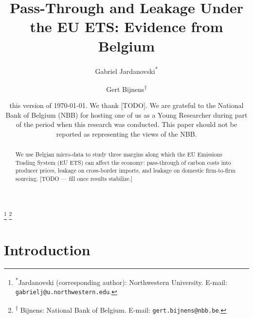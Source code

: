 \documentclass[11pt, reqno]{amsart}
\theoremstyle{definition}
\begin{document}
\title[]{Pass-Through and Leakage Under the EU ETS: Evidence from Belgium}

\author[]{Gabriel Jardanovski\textsuperscript{*} \and Gert Bijnens\textsuperscript{$\dagger$}}
\thanks{\noindent \textsuperscript{*}Jardanovski (corresponding author): Northwestern University. E-mail: \texttt{gabrielj@u.northwestern.edu}.}
\thanks{\textsuperscript{$\dagger$} Bijnens: National Bank of Belgium. E-mail: \texttt{gert.bijnens@nbb.be}.}

\date{\tiny{\sc this version} of \today. We thank [TODO]. We are grateful to the National Bank of Belgium (NBB) for hosting one of us as a Young Researcher during part of the period when this research was conducted. This paper should not be reported as representing the views of the NBB.}

\begin{abstract}
We use Belgian micro-data to study three margins along which the EU Emissions Trading System (EU ETS) can affect the economy: pass-through of carbon costs into producer prices, leakage on cross-border imports, and leakage on domestic firm-to-firm sourcing. [TODO — fill once results stabilize.]
\end{abstract}

\maketitle

\pagebreak

\section{Introduction}\label{sec:introduction}


\end{document}
